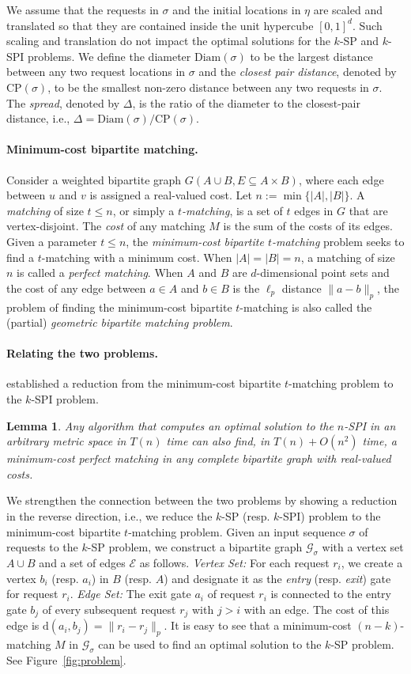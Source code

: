 \documentclass[11pt,onecolumn]{article}
\newcommand{\distance}[2]{\mathrm{d}(#1, #2)}
\newcommand{\requests}{\sigma}
\newtheorem{lemma}{Lemma}[section]
\newcommand\myparagraph[1]{\paragraph{#1}}
\begin{document}
We assume that the requests in $\requests$ and the initial locations in $\eta$ are scaled and translated so that they are contained inside the unit hypercube $[0,1]^d$. Such scaling and translation do not impact the optimal solutions for the $k$-SP and $k$-SPI problems. We define the diameter $\mathrm{Diam}(\requests)$ to be the largest distance between any two request locations in $\requests$ and the \emph{closest pair distance}, denoted by $\mathrm{CP}(\requests)$, to be the smallest non-zero distance between any two requests in $\requests$. The \emph{spread}, denoted by $\Delta$, is the ratio of the diameter to the closest-pair distance, i.e., $\Delta=\mathrm{Diam}(\requests)/\mathrm{CP}(\requests)$. 

\myparagraph{Minimum-cost bipartite matching.} Consider a weighted bipartite graph $G(A\cup B, E\subseteq A\times B)$, where each edge between $u$ and $v$ is assigned a real-valued cost. Let $n:=\min\{|A|, |B|\}$. A \emph{matching} of size $t\le n$, or simply a \emph{$t$-matching}, is a set of $t$ edges in $G$ that are vertex-disjoint. The \emph{cost} of any matching $M$ is the sum of the costs of its edges. Given a parameter $t \le n$, the \emph{minimum-cost bipartite $t$-matching} problem seeks to find a $t$-matching with a minimum cost. 
When $|A|=|B|=n$, a matching of size $n$ is called a \emph{perfect matching}. When $A$ and $B$ are $d$-dimensional point sets and the cost of any edge between $a \in A$ and $b \in B$ is the $\ell_p$ distance $\|a-b\|_p$, the problem of finding the minimum-cost bipartite $t$-matching is also called the (partial) \emph{geometric bipartite matching problem}. 


%


\myparagraph{Relating the two problems.}
\citet{chrobak1991new} established a reduction from the minimum-cost bipartite $t$-matching problem to the $k$-SPI problem.
\begin{lemma}\cite[Theorem 11]{chrobak1991new}
\label{lem:spimatch}
Any algorithm that computes an optimal solution to the $n$-SPI in an arbitrary metric space in $T(n)$ time can also find, in $T(n)+O(n^2)$ time, a minimum-cost perfect matching in any complete bipartite graph with real-valued costs.
\end{lemma}

We strengthen the connection between the two problems by showing a reduction in the reverse direction, i.e., we reduce the $k$-SP (resp. $k$-SPI) problem to the minimum-cost bipartite $t$-matching problem.
Given an input sequence $\requests$ of requests to the $k$-SP problem, we construct a bipartite graph $\mathcal{G}_{\requests}$ with a vertex set $A\cup B$ and a set of edges $\mathcal{E}$ as follows. 
{\it Vertex Set:} For each request $r_i$, we create a vertex $b_i$ (resp. $a_i$) in $B$ (resp. $A$) and designate it as the \emph{entry} (resp. \emph{exit}) gate for request $r_i$. 
{\it Edge Set:} The exit gate $a_i$ of request $r_i$ is connected to the entry gate $b_j$ of every subsequent request $r_j$ with $j > i$ with an edge. The cost of this edge is $\distance{a_i}{b_j}=\|r_i-r_j\|_p$. 
It is easy to see that a minimum-cost $(n-k)$-matching $M$ in $\mathcal{G}_\requests$ can be used to find an optimal solution to the $k$-SP problem. See Figure~\ref{fig:problem}. 
\end{document}

